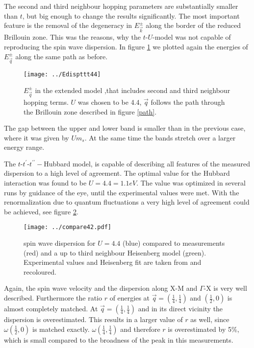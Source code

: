 The second and third neighbour hopping parameters are substantially smaller than $t$, but big enough to change the 
results significantly. 
 The most important feature is the removal of the degeneracy in $E^{\pm}_{\vec k}$ along the border of the reduced Brillouin zone.
This was the reasons, why the $t$-$U$-model was not capable of reproducing the spin wave dispersion. 
In figure \ref{tttE42} we plotted again the energies of $E^{\pm}_{\vec q}$ along the same path as before.
\begin{figure}
 \centering
\texttt{[image: ../Edispttt44]}
 \caption{$E^{\pm}_{\vec q}$ in the extended model ,that includes second and third neighbour hopping terms.
 $U$ was chosen to be 4.4,
 $\vec q$ follows the path through the Brillouin zone described in figure \ref{path}. }
 \label{tttE42}
\end{figure}
The gap between the upper and lower band is smaller than in the previous case, where it was given by $Um_s$.
At the same time the bands stretch over a larger energy range.





The $t$-$t^{\prime}$-$t^{\prime \prime}-$Hubbard model, 
is capable of describing all features of the measured dispersion to a high level of agreement. 
The optimal value for the Hubbard interaction was found to be $U=4.4=1.1eV$.
The value was optimized in several runs by guidance of the eye, until the experimental values were met.
With the renormalization due to quantum fluctuations a very high level of agreement could be achieved, see figure \ref{tttU42}.
%
\begin{figure}
 \begin{center}
  \texttt{[image: ../compare42.pdf]}
 \caption{ spin wave dispersion for $U=4.4$ (blue) compared to measurements (red) and a up to third neighbour Heisenberg model (green). 
 Experimental values and Heisenberg fit are taken from \cite{PhysRevLett.108.177003} and recoloured.} 
 \end{center}
\label{tttU42}
\end{figure}
%
Again, the spin wave velocity and the dispersion along X-M and $\Gamma$-X is very well described. 
Furthermore the ratio $r$ of energies at $\vec q = (\frac14,\frac14)$ and $(\frac12,0)$ is almost completely matched.
At $\vec q = (\frac14,\frac14)$ and in its direct vicinity the dispersion is overestimated.
This results in a larger value of $r$ as well, since $\omega(\frac12,0)$ is matched exactly.
$\omega(\frac14,\frac14)$ and therefore $r$ is overestimated by 5\%, 
which is small compared to the broadness of the peak in this measurements. 



